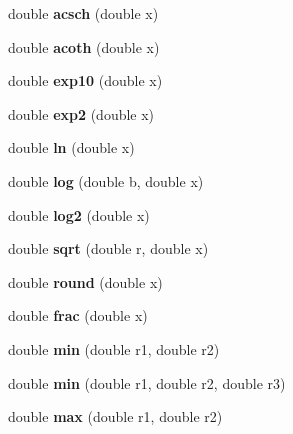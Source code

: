 \begin{DoxyCompactItemize}
double {\bfseries acsch} (double x)
\item 
\hypertarget{namespace_math_a8414a3b1ee6d4ccd1fd3551f8c955fba}{}\label{namespace_math_a8414a3b1ee6d4ccd1fd3551f8c955fba} 
double {\bfseries acoth} (double x)
\item 
\hypertarget{namespace_math_ae2ca2f78ff0f1f71aa328d39403c97ab}{}\label{namespace_math_ae2ca2f78ff0f1f71aa328d39403c97ab} 
double {\bfseries exp10} (double x)
\item 
\hypertarget{namespace_math_ae9b42f84eb3159b69b9fe31dc2a3789c}{}\label{namespace_math_ae9b42f84eb3159b69b9fe31dc2a3789c} 
double {\bfseries exp2} (double x)
\item 
\hypertarget{namespace_math_aff94712f453288e70b316359ac3cd337}{}\label{namespace_math_aff94712f453288e70b316359ac3cd337} 
double {\bfseries ln} (double x)
\item 
\hypertarget{namespace_math_ac88b6825885ff346bed43b89201c58a6}{}\label{namespace_math_ac88b6825885ff346bed43b89201c58a6} 
double {\bfseries log} (double b, double x)
\item 
\hypertarget{namespace_math_ad42859620da77fa57d5222e960bcaea4}{}\label{namespace_math_ad42859620da77fa57d5222e960bcaea4} 
double {\bfseries log2} (double x)
\item 
\hypertarget{namespace_math_ad933b16be63440aba73cda7e2a9642ac}{}\label{namespace_math_ad933b16be63440aba73cda7e2a9642ac} 
double {\bfseries sqrt} (double r, double x)
\item 
\hypertarget{namespace_math_a00e96965d28691c698e396a03a0334ea}{}\label{namespace_math_a00e96965d28691c698e396a03a0334ea} 
double {\bfseries round} (double x)
\item 
\hypertarget{namespace_math_ac2b5bb706ed069ca21f297d56d7863a0}{}\label{namespace_math_ac2b5bb706ed069ca21f297d56d7863a0} 
double {\bfseries frac} (double x)
\item 
\hypertarget{namespace_math_ae26b2810c63a7371c5ddcb2d6b8eee5f}{}\label{namespace_math_ae26b2810c63a7371c5ddcb2d6b8eee5f} 
double {\bfseries min} (double r1, double r2)
\item 
\hypertarget{namespace_math_af61c28c934487ea81975c12b964fb6fd}{}\label{namespace_math_af61c28c934487ea81975c12b964fb6fd} 
double {\bfseries min} (double r1, double r2, double r3)
\item 
\hypertarget{namespace_math_a3727fcec816696b6f7c7f96856eaceb5}{}\label{namespace_math_a3727fcec816696b6f7c7f96856eaceb5} 
double {\bfseries max} (double r1, double r2)
\item 
\hypertarget{namespace_math_ade03f4c828f4387e57d2022b9ac77baf}{}\label{namespace_math_ade03f4c828f4387e57d2022b9ac77baf} 

\end{DoxyCompactItemize}
